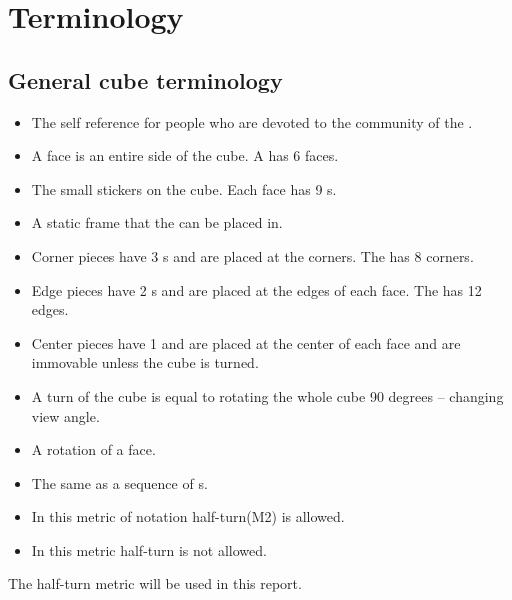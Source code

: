\chapter{Terminology}
\section{General cube terminology}
\label{sec:generalNotation}
\begin{itemize}
\item {}The self reference for people who are devoted to the community of the \rubik{}. 
\item {}A face is an entire side of the cube. A \rubik{} has 6 faces.
\item {}The small stickers on the cube. Each face has 9 \facet{}s.
\item \myTermHigh{\cubicle{}} A static frame that the \cpiece{} can be placed in.
\item {}Corner pieces have 3 \facet{}s and are placed at the corners. The \rubik{} has 8 corners. 
\item {}Edge pieces have 2 \facet{}s and are placed at the edges of each face. The \rubik{} has 12 edges.
\item {}Center pieces have 1 \facet{} and are placed at the center of each face and are immovable unless the cube is turned. 
\item {}A turn of the cube is equal to rotating the whole cube 90 degrees -- changing view angle.
\item {}A rotation of a face.%
\item {}The same as a sequence of \twist{}s.
\item {}In this metric of notation half-turn(M2) is allowed. 
\item {}In this metric half-turn is not allowed.
\end{itemize}
The half-turn metric will be used in this report. 

